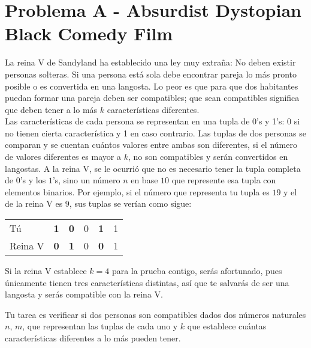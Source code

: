 \chapter*{Problema A - Absurdist Dystopian Black Comedy Film}


La reina V de Sandyland ha establecido una ley muy extraña: No deben existir personas solteras. 
Si una persona está sola debe encontrar pareja lo más pronto posible o es convertida en una langosta.
Lo peor es que para que dos habitantes puedan formar una pareja deben ser compatibles; que sean compatibles significa que deben tener a lo más $k$ características diferentes.
\\Las características de cada persona se representan en una tupla de 0's y 1's: 0 si no tienen cierta característica y 1 en caso contrario. 
Las tuplas de dos personas se comparan y se cuentan cuántos valores entre ambas son diferentes, si el número de valores diferentes es mayor a $k$, no son compatibles y serán convertidos en langostas.
A la reina V, se le ocurrió que no es necesario tener la tupla completa de $0$'s y los $1$'s, sino un número $n$ en base $10$ que represente esa tupla con elementos binarios.
Por ejemplo, si el número que representa tu tupla es $19$ y el de la reina V es $9$, sus tuplas se verían como sigue:

\begin{table}[!h]
\centering
\label{my-label}
\begin{tabular}{l|l|l|l|l|l|}
\cline{2-6} 
Tú      & \textbf{1} & \textbf{0} & 0 & \textbf{1} & 1 \\ \cline{2-6} 
Reina V & \textbf{0} & \textbf{1} & 0 & \textbf{0} & 1 \\ \cline{2-6} 
\end{tabular}
\end{table}

Si la reina V establece $k=4$ para la prueba contigo, serás afortunado, pues únicamente tienen tres características distintas, así que te salvarás de ser una langosta y serás compatible con la reina V.

Tu tarea es verificar si dos personas son compatibles dados dos números naturales $n$, $m$, que representan las tuplas de cada uno y $k$ que establece cuántas características diferentes a lo más pueden tener.
 

